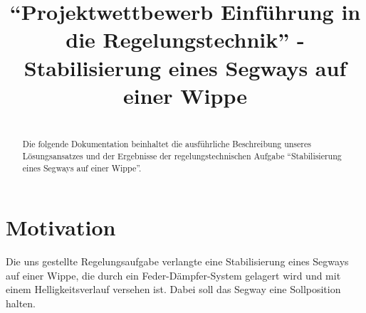 \documentclass[pdf]{ifacconf}
\begin{document}
\begin{frontmatter}

\title{``Projektwettbewerb Einführung in die Regelungstechnik'' - Stabilisierung eines Segways auf einer Wippe}


\textbf{}

\begin{abstract}\\                          %
Die folgende Dokumentation beinhaltet die ausführliche Beschreibung unseres Lösungsansatzes und der Ergebnisse der regelungstechnischen Aufgabe ``Stabilisierung eines Segways auf einer Wippe''. 
\end{abstract}

\end{frontmatter}

\section{Motivation}
Die uns gestellte Regelungsaufgabe verlangte eine Stabilisierung eines Segways auf einer Wippe, die durch ein Feder-Dämpfer-System gelagert wird und mit einem Helligkeitsverlauf versehen ist. Dabei soll das Segway eine Sollposition halten. 
\end{document}
